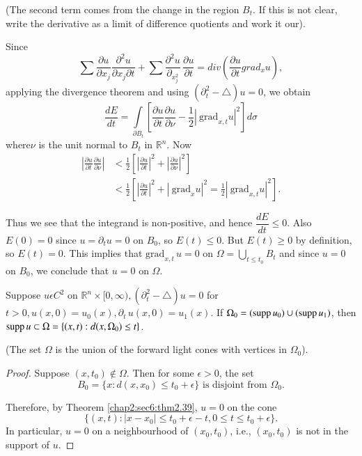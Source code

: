 (The second term comes from the change in the region $B_t$. If this is
not clear, write the derivative as a limit of difference quotients and
work it our). 

Since
$$
\sum \frac{\partial u}{\partial x_j} \frac{\partial^2 u}{\partial x_j
  \partial t} + \sum \frac{\partial^2 u}{ \partial_{x_j^2}}\,
\frac{\partial u}{\partial t} = div \left(\frac{\partial u}{\partial t}
grad_x u\right), 
$$
applying the divergence theorem and using $(\partial^2_t - \triangle)
u = 0$, we obtain  
$$
\frac{dE}{dt} = \int\limits_{\partial B_t} \left[ \frac{\partial
    u}{\partial t} \frac{\partial u}{\partial \nu} - \frac{1}{2} |
  ~\text{grad}_{x, t} u |^2 \right] d \sigma  
$$
where\pageoriginale $\nu$ is the unit normal to $B_t$ in $\mathbb{R}^n$. Now 
\begin{align*}
  | \frac{\partial u}{\partial t} \frac{\partial u}{\partial \nu} | &<
  \frac{1}{2} \left[ | \frac{\partial u}{\partial t} |^2 + | \frac{\partial
      u}{\partial \nu} |^2 \right]\\ 
  & < \frac{1}{2} \left[ | \frac{\partial u}{\partial t} |^2 + |
    ~\text{grad}_x u |^2  = \frac{1}{2} | ~\text{grad}_{x, t} u |^2\right]. 
\end{align*}

Thus we see that the integrand is non-positive, and hence
$\dfrac{dE}{dt} \leq 0$. Also $E(0) = 0$ since $u = \partial_t u = 0$
on $B_0$, so $E (t) \leq 0$. But $E (t) \geq 0$ by definition, so $E
(t) = 0$. This implies that $\text{grad}_{x, t} \,u = 0$ on $\Omega =
\bigcup\limits_{t \leq t_0} B_t$ and since $u = 0$ on $B_0$, we
conclude that $u = 0$ on $\Omega$. 

\setcounter{coro}{39}
\begin{coro} \label{chap2:sec6:coro2.40} %
  Suppose $u \epsilon C^2$ on $\mathbb{R}^n \times [0, \infty),
    (\partial^2_t - \triangle ) u = 0$ for $t > 0, u (x, 0) =
  u_0 (x), \partial_t \,u (x, 0) = u_1 (x)$. If $\Omega_0 =
  (\operatorname{supp}  u_0) \cup (\operatorname{supp} u_1)$, then $\operatorname{supp} u \subset \Omega
  = \{(x, t) : d(x, \Omega_0) \leq t \}$. 
\end{coro}

(The set $\Omega$ is the union of the forward light cones with
vertices in $\Omega_0$). 
\begin{proof}
  Suppose $(x, t_0) \notin \Omega$. Then for some $\epsilon
  > 0$, the set  
  $$
  B_0 = \{ x: d (x, x_0) \leq t_0 + \epsilon \} \text{ is disjoint
    from } \Omega_0. 
  $$
  
  Therefore, by Theorem \ref{chap2:sec6:thm2.39}, $u = 0$ on the cone
  $$
  \{ (x, t) : | x - x_0 | \leq t_0 + \epsilon - t, 0 \leq t \leq t_0
  + \epsilon \}. 
  $$
  In particular, $u = 0$ on a neighbourhood of $(x_0, t_0)$, i.e., $(x_0,
  t_0)$ is not in the support of $u$. 
\end{proof}

